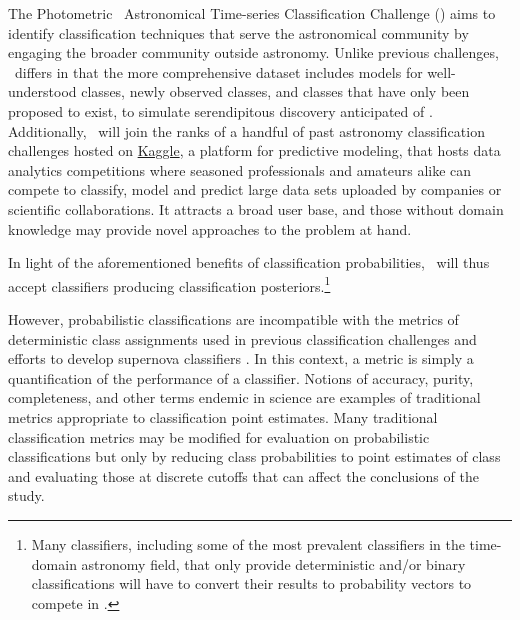 The Photometric \lsst\ Astronomical Time-series Classification Challenge (\plasticc) aims to identify classification techniques that serve the astronomical community by engaging the broader community outside astronomy.
Unlike previous challenges, \plasticc\ differs in that the more comprehensive dataset includes models for well-understood classes, newly observed classes, and classes that have only been proposed to exist, to simulate serendipitous discovery anticipated of \lsst.
Additionally, \plasticc\ will join the ranks of a handful of past astronomy classification challenges hosted on \href{https://www.kaggle.com/competitions}{Kaggle}, a platform for predictive modeling, that hosts data analytics competitions where seasoned professionals and amateurs alike can compete to classify, model and predict large data sets uploaded by companies or scientific collaborations.
It attracts a broad user base, and those without domain knowledge may provide novel approaches to the problem at hand.

In light of the aforementioned benefits of classification probabilities, \plasticc\ will thus accept classifiers producing classification posteriors.\footnote{Many classifiers, including some of the most prevalent classifiers in the time-domain astronomy field, that only provide deterministic and/or binary classifications will have to convert their results to probability vectors to compete in \plasticc.}

However, probabilistic classifications are incompatible with the metrics of deterministic class assignments used in previous classification challenges \citep{kessler_supernova_2010, kessler_results_2010} and efforts to develop supernova classifiers \citep{2018ApJS..236....9N}.
In this context, a metric is simply a quantification of the performance of a classifier.
Notions of accuracy, purity, completeness, and other terms endemic in science are examples of traditional metrics appropriate to classification point estimates.
Many traditional classification metrics may be modified for evaluation on probabilistic classifications \citep{lochner_photometric_2016, moller_photometric_2016, hon_deep_2017, hon_detecting_2018, 2011arXiv1108.4696G} but only by reducing class probabilities to point estimates of class and evaluating those at discrete cutoffs that can affect the conclusions of the study.

